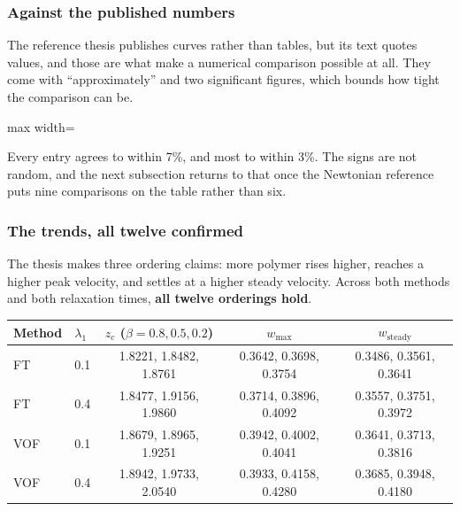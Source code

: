 \subsubsection{Against the published numbers}

The reference thesis publishes curves rather than tables, but its text quotes
values, and those are what make a numerical comparison possible at all. They
come with ``approximately'' and two significant figures, which bounds how tight
the comparison can be.

\begin{table}[htbp]
\centering
\caption{Measured against the values the reference thesis states in its text.}
\label{tab:vethesis}
\small
\begin{adjustbox}{max width=\linewidth}
\end{adjustbox}
\end{table}

Every entry agrees to within 7\%, and most to within 3\%. The signs are not
random, and the next subsection returns to that once the Newtonian reference
puts nine comparisons on the table rather than six.

\subsubsection{The trends, all twelve confirmed}

The thesis makes three ordering claims: more polymer rises higher, reaches a
higher peak velocity, and settles at a higher steady velocity. Across both
methods and both relaxation times, \textbf{all twelve orderings hold}.

\begin{center}
\small
\begin{tabular}{llccc}
\toprule
Method & $\lambda_1$ & $z_c$ ($\beta = 0.8, 0.5, 0.2$) & $w_{\max}$ & $w_{\mathrm{steady}}$ \\
\midrule
FT  & 0.1 & 1.8221, 1.8482, 1.8761 & 0.3642, 0.3698, 0.3754 & 0.3486, 0.3561, 0.3641 \\
FT  & 0.4 & 1.8477, 1.9156, 1.9860 & 0.3714, 0.3896, 0.4092 & 0.3557, 0.3751, 0.3972 \\
VOF & 0.1 & 1.8679, 1.8965, 1.9251 & 0.3942, 0.4002, 0.4041 & 0.3641, 0.3713, 0.3816 \\
VOF & 0.4 & 1.8942, 1.9733, 2.0540 & 0.3933, 0.4158, 0.4280 & 0.3685, 0.3948, 0.4180 \\
\bottomrule
\end{tabular}
\end{center}

